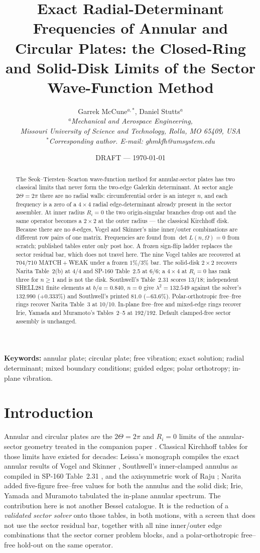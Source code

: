 \documentclass[11pt]{article}
\title{\bfseries Exact Radial-Determinant Frequencies of Annular and
Circular Plates: the Closed-Ring and Solid-Disk Limits of the
Sector Wave-Function Method}
\author{Garrek McCune$^{a,*}$, Daniel Stutts$^{a}$\\
\small\itshape $^a$Mechanical and Aerospace Engineering,\\
Missouri University of Science and Technology, Rolla, MO 65409, USA\\
\small\upshape $^*$Corresponding author. E-mail: ghmkfh@umsystem.edu}
\date{DRAFT --- \today}
\newcommand{\lamsq}{\lambda^{2}}
\begin{document}
\maketitle

\begin{abstract}
The Seok--Tiersten--Scarton wave-function method for annular-sector plates
has two classical limits that never form the two-edge Galerkin determinant.
At sector angle $2\Theta=2\pi$ there are no radial walls: circumferential
order is an integer $n$, and each frequency is a zero of a $4\times4$ radial
edge-determinant already present in the sector assembler. At inner radius
$R_i=0$ the two origin-singular branches drop out and the same operator
becomes a $2\times2$ at the outer radius --- the classical Kirchhoff disk.
Because there are no $\theta$-edges, Vogel and Skinner's nine inner/outer
combinations are different row pairs of one matrix. Frequencies are found
from $\det L(n,\Omega)=0$ from scratch; published tables enter only post
hoc. A frozen sign-flip ladder replaces the sector residual bar, which does
not travel here. The nine Vogel tables are recovered at 704/710
MATCH${}+{}$WEAK under a frozen $1\%/3\%$ bar. The solid-disk $2\times2$
recovers Narita Table~2(b) at 4/4 and SP-160 Table~2.5 at 6/6; a
$4\times4$ at $R_i=0$ has rank three for $n\ge1$ and is not the disk.
Southwell's Table~2.31 scores 13/18; independent SHELL281 finite elements
at $b/a=0.840$, $n=0$ give $\lamsq=132.549$ against the solver's $132.990$
($+0.333\%$) and Southwell's printed $81.0$ ($-63.6\%$). Polar-orthotropic
free--free rings recover Narita Table~3 at 10/10. In-plane free--free and
mixed-edge rings recover Irie, Yamada and Muramoto's Tables~2--5 at
192/192. Default clamped-free sector assembly is unchanged.
\end{abstract}

\noindent\textbf{Keywords:} annular plate; circular plate; free vibration;
exact solution; radial determinant; mixed boundary conditions; guided
edges; polar orthotropy; in-plane vibration.

\section{Introduction}\label{sec:intro}
Annular and circular plates are the $2\Theta=2\pi$ and $R_i=0$ limits of the
annular-sector geometry treated in the companion paper
\cite{mccune2026annular}. Classical Kirchhoff tables for those limits have
existed for decades: Leissa's monograph \cite{leissaSP160} compiles the exact
annular results of Vogel and Skinner \cite{vogelSkinner}, Southwell's
inner-clamped annulus as compiled in SP-160 Table~2.31 \cite{southwell},
and the axisymmetric work of Raju \cite{raju}; Narita \cite{narita1984} added
five-figure free--free values for both the annulus and the solid disk; Irie,
Yamada and Muramoto \cite{irie1984} tabulated the in-plane annular spectrum.
The contribution here is not another Bessel catalogue. It is the reduction of
a \emph{validated sector solver} onto those tables, in both motions, with a
screen that does not use the sector residual bar, together with all nine
inner/outer edge combinations that the sector corner problem blocks, and a
polar-orthotropic free--free hold-out on the same operator.
\end{document}

